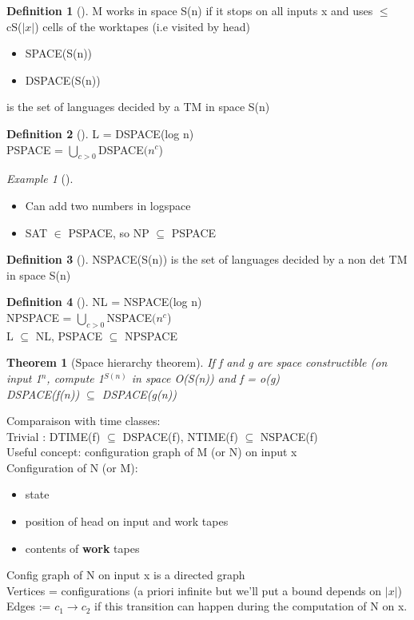 \documentclass{article}
\newtheorem{theorem}{Theorem}
\theoremstyle{definition}
\newtheorem{definition}{Definition}
\theoremstyle{remark}
\newtheorem*{example}{Example}
\newcommand{\Thm}[3]{\begin{theorem}[#1]\label{#2}#3\end{theorem}}
\newcommand{\Ex}[3]{\begin{example}[#1]\label{#2}#3\end{example}}
\newcommand{\Def}[3]{\begin{definition}[#1]\label{#2}#3\end{definition}}
\begin{document}
\Def{}{}{M works in space S(n) if it stops on all inputs x and uses $\leq$ cS($|x|$) cells of the worktapes (i.e visited by head)
	\begin{itemize}
		\item SPACE(S(n))
		\item DSPACE(S(n))
	\end{itemize}
	 is the set of languages decided by a TM in space S(n)}

\Def{}{}{L = DSPACE(log n)\\
	PSPACE = $\bigcup\limits_{c>0}$DSPACE$(n^c$)}

\Ex{}{}{~\\\begin{itemize}
		\item Can add two numbers in logspace
		\item SAT $\in$ PSPACE, so NP $\subseteq$ PSPACE
	\end{itemize}}
	
\Def{}{}{NSPACE(S(n)) is the set of languages decided by a non det TM in space S(n)}

\Def{}{}{NL = NSPACE(log n)\\
	NPSPACE = $\bigcup\limits_{c>0}$NSPACE$(n^c$)\\
	L $\subseteq$ NL, PSPACE $\subseteq$ NPSPACE}

\Thm{Space hierarchy theorem}{}{If f and g are space constructible (on input 1$^n$, compute 1$^{S(n)}$ in space O(S(n)) and f = o(g)\\
DSPACE(f(n)) $\subseteq$ DSPACE(g(n))}

Comparaison with time classes:\\
Trivial : DTIME(f) $\subseteq$ DSPACE(f), NTIME(f) $\subseteq$ NSPACE(f)\\

Useful concept: configuration graph of M (or N) on input x\\

Configuration of N (or M):\begin{itemize}
	\item state
	\item position of head on input and work tapes
	\item contents of \textbf{work} tapes
\end{itemize}

Config graph of N on input x is a directed graph\\
Vertices = configurations (a priori infinite but we'll put a bound depends on $|x|$)\\
Edges := $c_1 \rightarrow c_2$ if this transition can happen during the computation of N on x.\\
\end{document}
